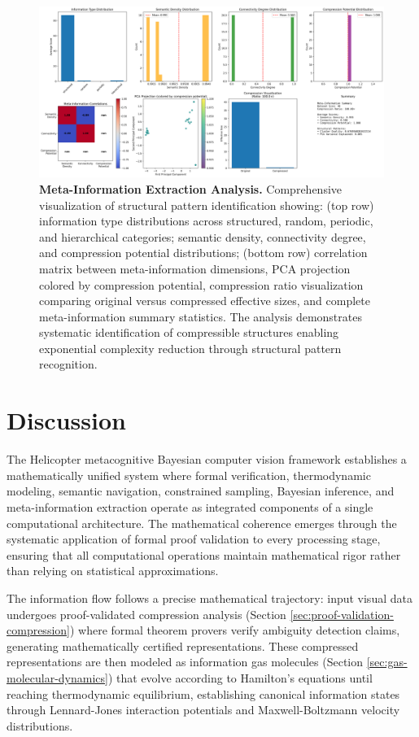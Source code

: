 \documentclass[11pt,a4paper]{article}
\begin{document}
\begin{figure}[htbp]
\centering
\includegraphics[width=\textwidth]{images/meta_information_extraction_demo.png}
\caption{\textbf{Meta-Information Extraction Analysis.} Comprehensive visualization of structural pattern identification showing: (top row) information type distributions across structured, random, periodic, and hierarchical categories; semantic density, connectivity degree, and compression potential distributions; (bottom row) correlation matrix between meta-information dimensions, PCA projection colored by compression potential, compression ratio visualization comparing original versus compressed effective sizes, and complete meta-information summary statistics. The analysis demonstrates systematic identification of compressible structures enabling exponential complexity reduction through structural pattern recognition.}
\label{fig:meta-information-extraction}
\end{figure}

\section{Discussion}
\label{sec:discussion}

The Helicopter metacognitive Bayesian computer vision framework establishes a mathematically unified system where formal verification, thermodynamic modeling, semantic navigation, constrained sampling, Bayesian inference, and meta-information extraction operate as integrated components of a single computational architecture. The mathematical coherence emerges through the systematic application of formal proof validation to every processing stage, ensuring that all computational operations maintain mathematical rigor rather than relying on statistical approximations.

The information flow follows a precise mathematical trajectory: input visual data undergoes proof-validated compression analysis (Section \ref{sec:proof-validation-compression}) where formal theorem provers verify ambiguity detection claims, generating mathematically certified representations. These compressed representations are then modeled as information gas molecules (Section \ref{sec:gas-molecular-dynamics}) that evolve according to Hamilton's equations until reaching thermodynamic equilibrium, establishing canonical information states through Lennard-Jones interaction potentials and Maxwell-Boltzmann velocity distributions.
\end{document}
